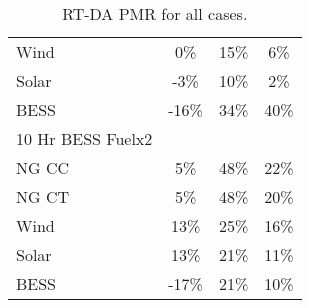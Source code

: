 \begin{table*}[htbp]
\begin{tabular}{lccc}
\quad Wind & 0\% & 15\% & 6\% \\
\quad Solar & -3\% & 10\% & 2\% \\
\quad BESS & -16\% & 34\% & 40\% \\
\midrule
10 Hr BESS Fuelx2 \\
\quad NG CC & 5\% & 48\% & 22\% \\
\quad NG CT & 5\% & 48\% & 20\% \\
\quad Wind & 13\% & 25\% & 16\% \\
\quad Solar & 13\% & 21\% & 11\% \\
\quad BESS & -17\% & 21\% & 10\% \\
\midrule
\bottomrule
\end{tabular}
\caption{RT-DA PMR for all cases.}
\label{tab:table4_all_cases}
\end{table*}
